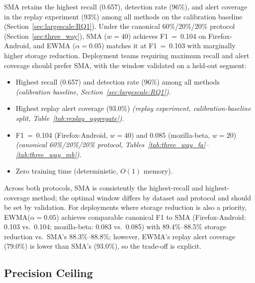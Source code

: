 \documentclass[pdflatex,sn-nature]{sn-jnl}
\theoremstyle{thmstyleone}%
\begin{document}
SMA retains the highest recall (0.657), detection rate (96\%), and alert
coverage in the replay experiment (93\%) among all methods on the
calibration baseline (Section~\ref{sec:largescale:RQ1}).
Under the canonical 60\%/20\%/20\% protocol (Section~\ref{sec:three_way}),
SMA ($w=40$) achieves F1~=~0.104 on Firefox-Android, and EWMA ($\alpha=0.05$)
matches it at F1~=~0.103 with marginally higher storage reduction.
Deployment teams requiring maximum recall and alert coverage should prefer
SMA, with the window validated on a held-out segment:
\begin{itemize}
  \item Highest recall (0.657) and detection rate (96\%) among all methods
    \textit{(calibration baseline, Section~\ref{sec:largescale:RQ1})}.
  \item Highest replay alert coverage (93.0\%)
    \textit{(replay experiment, calibration-baseline split,
    Table~\ref{tab:replay_aggregate})}.
  \item F1~=~0.104 (Firefox-Android, $w=40$) and 0.085 (mozilla-beta, $w=20$)
    \textit{(canonical 60\%/20\%/20\% protocol,
    Tables~\ref{tab:three_way_fa}--\ref{tab:three_way_mb})}.
  \item Zero training time (deterministic, $O(1)$ memory).
\end{itemize}
Across both protocols, SMA is consistently the highest-recall and
highest-coverage method; the optimal window differs by dataset and protocol
and should be set by validation.
For deployments where storage reduction is also a priority,
EWMA($\alpha=0.05$) achieves comparable canonical F1 to SMA
(Firefox-Android: 0.103 vs.\ 0.104; mozilla-beta: 0.083 vs.\ 0.085)
with 89.4\%--88.5\% storage reduction vs.\ SMA's 88.3\%--88.8\%;
however, EWMA's replay alert coverage (79.0\%) is lower than SMA's (93.0\%),
so the trade-off is explicit.

\subsection{Precision Ceiling}
\end{document}
